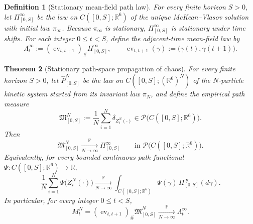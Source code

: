 \documentclass[11pt]{article}
\newtheorem{theorem}{Theorem}[section]
\newtheorem{definition}[theorem]{Definition}
\theoremstyle{remark}
\newcommand{\R}{\mathbb R}
\begin{document}
\begin{definition}[Stationary mean-field path law]
\label{def:stationary-path-law}
For every finite horizon $S>0$, let $\Pi_{[0,S]}^\infty$ be the law on
$C([0,S];\R^6)$ of the unique McKean--Vlasov solution with initial law
$\pi_\infty$.
Because $\pi_\infty$ is stationary, $\Pi_{[0,S]}^\infty$ is stationary under
time shifts.
For each integer $0\le t<S$, define the adjacent-time mean-field law by
\[
\Lambda_t^\infty
:=
(\operatorname{ev}_{t,t+1})_\#\Pi_{[0,S]}^\infty,
\qquad
\operatorname{ev}_{t,t+1}(\gamma):=\bigl(\gamma(t),\gamma(t+1)\bigr).
\]
\end{definition}

\begin{theorem}[Stationary path-space propagation of chaos]
\label{thm:stationary-path-poc}
For every finite horizon $S>0$, let $\widehat P_{[0,S]}^N$ be the law on
$C([0,S];(\R^6)^N)$ of the $N$-particle kinetic system started from its
invariant law $\pi_N$, and define the empirical path measure
\[
\mathfrak M_{[0,S]}^N
:=
\frac1N\sum_{i=1}^N \delta_{Z_i^N(\cdot)}
\in \mathcal P\bigl(C([0,S];\R^6)\bigr).
\]
Then
\[
\mathfrak M_{[0,S]}^N
\xrightarrow[N\to\infty]{\mathbb P}
\Pi_{[0,S]}^\infty
\qquad
\text{in }\mathcal P\bigl(C([0,S];\R^6)\bigr).
\]
Equivalently, for every bounded continuous path functional
$\Psi:C([0,S];\R^6)\to\R$,
\[
\frac1N\sum_{i=1}^N \Psi\!\bigl(Z_i^N(\cdot)\bigr)
\xrightarrow[N\to\infty]{\mathbb P}
\int_{C([0,S];\R^6)} \Psi(\gamma)\,\Pi_{[0,S]}^\infty(d\gamma).
\]
In particular, for every integer $0\le t<S$,
\[
M_t^N
=(\operatorname{ev}_{t,t+1})_\# \mathfrak M_{[0,S]}^N
\xrightarrow[N\to\infty]{\mathbb P}
\Lambda_t^\infty .
\]
\end{theorem}
\end{document}
